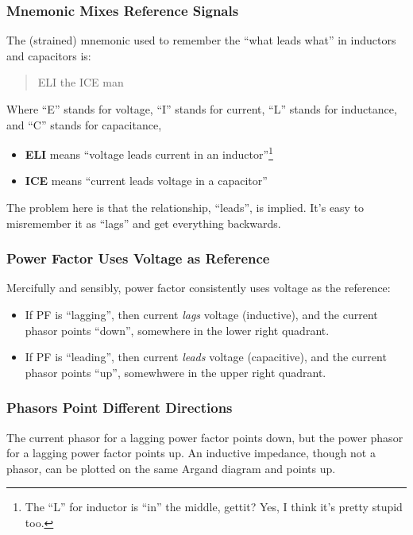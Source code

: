 \documentclass[11pt]{article}
\begin{document}
\subsubsection{Mnemonic Mixes Reference Signals}

The (strained) mnemonic used to remember the ``what leads
what'' in inductors and capacitors is:

\begin{quote}
\centering
ELI the ICE man
\end{quote}

Where ``E'' stands for voltage, ``I'' stands for current, ``L''
stands for inductance, and ``C'' stands for capacitance,

\begin{itemize}
  \item {\bf ELI} means ``voltage leads current in an inductor''\footnote{The ``L'' for inductor is ``in'' the middle, gettit? Yes, I think it's pretty stupid too.}
  \item {\bf ICE} means ``current leads voltage in a capacitor''
\end{itemize}

The problem here is that the relationship, ``leads'', is implied. It's
easy to misremember it as ``lags'' and get everything backwards.


\subsubsection{Power Factor Uses Voltage as Reference}

Mercifully and sensibly, power factor consistently uses voltage as the reference:

\begin{itemize}
  \item If PF is ``lagging'', then current \emph{lags} voltage
    (inductive), and the current phasor points ``down'', somewhere in
    the lower right quadrant.
  \item If PF is ``leading'', then current \emph{leads} voltage (capacitive), and the current phasor points ``up'', somewhwere in the upper right quadrant.
\end{itemize}


\subsubsection{Phasors Point Different Directions}

The current phasor for a lagging power factor points down, but the
power phasor for a lagging power factor points up. An inductive
impedance, though not a phasor, can be plotted on the same Argand
diagram and points up.
\end{document}
